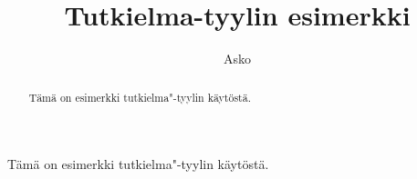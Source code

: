 \documentclass{tutkielma}
\title{Tutkielma-tyylin esimerkki}
\author{Asko}{Tapani}{Soukka}
\begin{document}
\maketitle

\begin{abstract}

Tämä on esimerkki tutkielma"-tyylin käytöstä.

\end{abstract}

\begin{foreignabstract}

Tämä on esimerkki tutkielma"-tyylin käytöstä.

\end{foreignabstract}

\tableofcontents





\appendix


\end{document}
